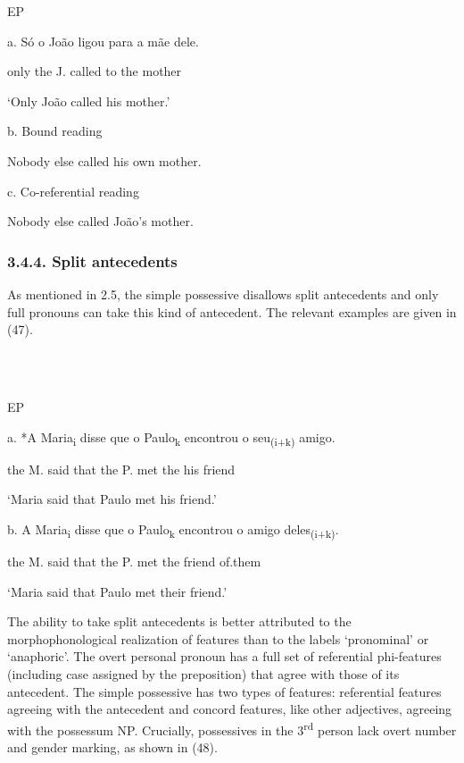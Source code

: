 \documentclass[output=paper]{langsci/langscibook}
\begin{document}
          EP

  a.  Só o João ligou para a mãe dele.  

only the J. called to the mother

‘Only João called his mother.’

b.  Bound reading

Nobody else called his own mother.

c.  Co-referential reading

Nobody else called João’s mother.

\subsubsection{ 3.4.4. Split antecedents}

As mentioned in 2.5, the simple possessive disallows split antecedents and only full pronouns can take this kind of antecedent. The relevant examples are given in (47).

\ea%
    \label{ex:key:47}
    \gll\\
        \\
    \glt
    \z

          EP

  a.  *A Maria\textsubscript{i} disse que o Paulo\textsubscript{k} encontrou o seu\textsubscript{(i+k)} amigo.

the M. said that the P. met the his friend

‘Maria said that Paulo met his friend.’

  b.  A Maria\textsubscript{i} disse que o Paulo\textsubscript{k} encontrou o amigo deles\textsubscript{(i+k)}.

the M. said that the P. met the friend of.them

‘Maria said that Paulo met their friend.’

The ability to take split antecedents is better attributed to the morphophonological realization of features than to the labels ‘pronominal’ or ‘anaphoric’. The overt personal pronoun has a full set of referential phi-features (including case assigned by the preposition) that agree with those of its antecedent. The simple possessive has two types of features: referential features agreeing with the antecedent and concord features, like other adjectives, agreeing with the possessum NP. Crucially, possessives in the 3\textsuperscript{rd} person lack overt number and gender marking, as shown in (48).

\ea%
    \label{ex:key:48}
    \gll\\
        \\
    \glt
    \z
\end{document}
